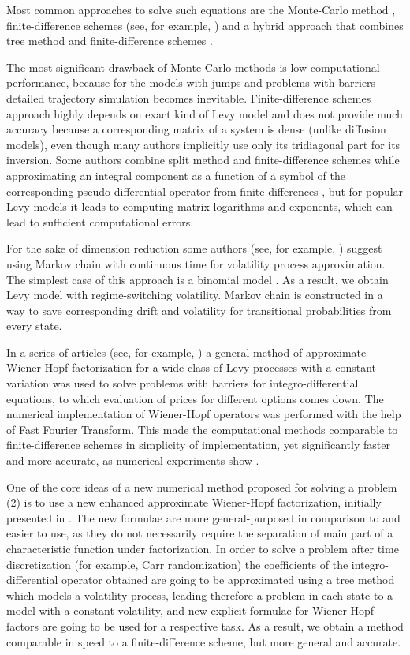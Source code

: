 \documentclass[a4paper]{jpconf}
\begin{document}
Most common approaches to solve such equations are the Monte-Carlo method \cite{alfonsi}, finite-difference schemes (see, for example, \cite{chiarella}) and a hybrid approach that combines tree method and finite-difference schemes \cite{zanette_heston}.

The most significant drawback of Monte-Carlo methods is low computational performance, because for the models with jumps and problems with barriers detailed trajectory simulation becomes inevitable. Finite-difference schemes approach highly depends on exact kind of Levy model and does not provide much accuracy because a corresponding matrix of a system is dense (unlike diffusion models), even though many authors implicitly use only its tridiagonal part for its inversion.
Some authors combine split method and finite-difference schemes while approximating an integral component as a function of a symbol of the corresponding pseudo-differential operator from finite differences \cite{itkin}, but for popular Levy models it leads to computing matrix logarithms and exponents, which can lead to sufficient computational errors.

For the sake of dimension reduction some authors (see, for example, \cite{chourdakis, zanette_tree}) suggest using Markov chain with continuous time for volatility process approximation. The simplest case of this approach is a binomial model \cite{zanette_tree}. As a result, we obtain Levy model with regime-switching volatility. Markov chain is constructed in a way to save corresponding drift and volatility for transitional probabilities from every state. 

In a series of articles (see, for example, \cite{kudr_and_lev}) a general method of approximate Wiener-Hopf factorization for a wide class of Levy processes with a constant variation was used to solve problems with barriers for integro-differential equations, to which evaluation of prices for different options comes down. The numerical implementation of Wiener-Hopf operators was performed with the help of Fast Fourier Transform. This made the computational methods comparable to finite-difference schemes in simplicity of implementation, yet significantly faster and more accurate, as numerical experiments show \cite{kudr_and_lev}. 

One of the core ideas of a new numerical method proposed for solving a problem (2) is to use a new enhanced approximate Wiener-Hopf factorization, initially presented in \cite{kudr_mex}. The new formulae are more general-purposed in comparison to \cite{kudr_and_lev} and easier to use, as they do not necessarily require the separation of main part of a characteristic function under factorization. In order to solve a problem after time discretization (for example, Carr randomization) the coefficients of the integro-differential operator obtained are going to be approximated using a tree method which models a volatility process, leading therefore a problem in each state to a model with a constant volatility, and new explicit formulae for Wiener-Hopf factors are going to be used for a respective task. As a result, we obtain a method comparable in speed to a finite-difference scheme, but more general and accurate.
\end{document}
